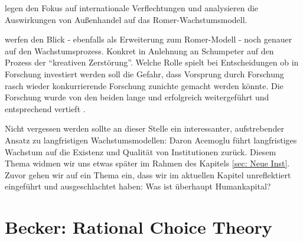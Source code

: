 \textcite{Grossman1991a, Grossman1991b} legen den Fokus auf internationale Verflechtungen und analysieren die Auswirkungen von Außenhandel auf das Romer-Wachstumsmodell.

\textcite{Aghion1992} werfen den Blick - ebenfalls als Erweiterung zum Romer-Modell - noch genauer auf den Wachstumsprozess. Konkret in Anlehnung an Schumpeter auf den Prozess der "`kreativen Zerstörung"'. Welche Rolle spielt bei Entscheidungen ob in Forschung investiert werden soll die Gefahr, dass Vorsprung durch Forschung rasch wieder konkurrierende Forschung zunichte gemacht werden könnte. Die Forschung wurde von den beiden lange und erfolgreich weitergeführt und entsprechend vertieft \parencite{Aghion2005}.

Nicht vergessen werden sollte an dieser Stelle ein interessanter, aufstrebender Ansatz zu langfristigen Wachstumsmodellen: Daron Acemoglu führt langfristiges Wachstum auf die Existenz und Qualität von Institutionen zurück. Diesem Thema widmen wir uns etwas später im Rahmen des Kapitels \ref{sec: Neue Inst}. Zuvor gehen wir auf ein Thema ein, dass wir im aktuellen Kapitel unreflektiert eingeführt und ausgeschlachtet haben: Was ist überhaupt Humankapital?

\section{Becker: Rational Choice Theory}  \label{sec: Becker}

